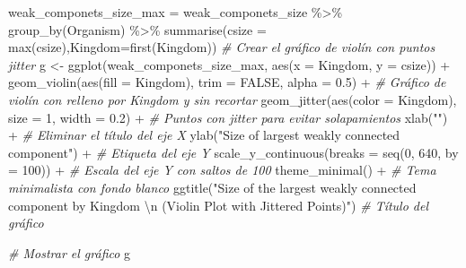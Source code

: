 \documentclass[
  letterpaper,
  DIV=11,
  numbers=noendperiod]{scrreprt}
\newenvironment{Shaded}{}{}
\newcommand{\AttributeTok}[1]{\textcolor[rgb]{0.78,0.47,0.87}{#1}}
\newcommand{\CommentTok}[1]{\textcolor[rgb]{0.36,0.39,0.44}{\textit{#1}}}
\newcommand{\ConstantTok}[1]{\textcolor[rgb]{0.82,0.60,0.40}{#1}}
\newcommand{\DecValTok}[1]{\textcolor[rgb]{0.82,0.60,0.40}{#1}}
\newcommand{\FloatTok}[1]{\textcolor[rgb]{0.82,0.60,0.40}{#1}}
\newcommand{\FunctionTok}[1]{\textcolor[rgb]{0.38,0.69,0.94}{#1}}
\newcommand{\NormalTok}[1]{\textcolor[rgb]{0.67,0.70,0.75}{#1}}
\newcommand{\OtherTok}[1]{\textcolor[rgb]{0.15,0.68,0.38}{#1}}
\newcommand{\SpecialCharTok}[1]{\textcolor[rgb]{0.34,0.71,0.76}{#1}}
\newcommand{\StringTok}[1]{\textcolor[rgb]{0.60,0.76,0.47}{#1}}
\begin{document}
\begin{Shaded}
\begin{Highlighting}[]
\NormalTok{weak\_componets\_size\_max }\OtherTok{=}\NormalTok{ weak\_componets\_size }\SpecialCharTok{\%\textgreater{}\%}
  \FunctionTok{group\_by}\NormalTok{(Organism) }\SpecialCharTok{\%\textgreater{}\%}
  \FunctionTok{summarise}\NormalTok{(}\AttributeTok{csize =} \FunctionTok{max}\NormalTok{(csize),}\AttributeTok{Kingdom=}\FunctionTok{first}\NormalTok{(Kingdom))}
\CommentTok{\# Crear el gráfico de violín con puntos jitter}
\NormalTok{g }\OtherTok{\textless{}{-}} \FunctionTok{ggplot}\NormalTok{(weak\_componets\_size\_max, }\FunctionTok{aes}\NormalTok{(}\AttributeTok{x =}\NormalTok{ Kingdom, }\AttributeTok{y =}\NormalTok{ csize)) }\SpecialCharTok{+}
  \FunctionTok{geom\_violin}\NormalTok{(}\FunctionTok{aes}\NormalTok{(}\AttributeTok{fill =}\NormalTok{ Kingdom), }\AttributeTok{trim =} \ConstantTok{FALSE}\NormalTok{, }\AttributeTok{alpha =} \FloatTok{0.5}\NormalTok{) }\SpecialCharTok{+}  \CommentTok{\# Gráfico de violín con relleno por \textquotesingle{}Kingdom\textquotesingle{} y sin recortar}
  \FunctionTok{geom\_jitter}\NormalTok{(}\FunctionTok{aes}\NormalTok{(}\AttributeTok{color =}\NormalTok{ Kingdom), }\AttributeTok{size =} \DecValTok{1}\NormalTok{, }\AttributeTok{width =} \FloatTok{0.2}\NormalTok{) }\SpecialCharTok{+}  \CommentTok{\# Puntos con jitter para evitar solapamientos}
  \FunctionTok{xlab}\NormalTok{(}\StringTok{""}\NormalTok{) }\SpecialCharTok{+}  \CommentTok{\# Eliminar el título del eje X}
  \FunctionTok{ylab}\NormalTok{(}\StringTok{"Size of  largest weakly connected component"}\NormalTok{) }\SpecialCharTok{+}  \CommentTok{\# Etiqueta del eje Y}
  \FunctionTok{scale\_y\_continuous}\NormalTok{(}\AttributeTok{breaks =} \FunctionTok{seq}\NormalTok{(}\DecValTok{0}\NormalTok{, }\DecValTok{640}\NormalTok{, }\AttributeTok{by =} \DecValTok{100}\NormalTok{)) }\SpecialCharTok{+}  \CommentTok{\# Escala del eje Y con saltos de 100}
  \FunctionTok{theme\_minimal}\NormalTok{() }\SpecialCharTok{+}  \CommentTok{\# Tema minimalista con fondo blanco}
  \FunctionTok{ggtitle}\NormalTok{(}\StringTok{"Size of the largest weakly connected component by Kingdom }\SpecialCharTok{\textbackslash{}n}\StringTok{ (Violin Plot with Jittered Points)"}\NormalTok{)  }\CommentTok{\# Título del gráfico}

\CommentTok{\# Mostrar el gráfico}
\NormalTok{g}
\end{Highlighting}
\end{Shaded}
\end{document}
